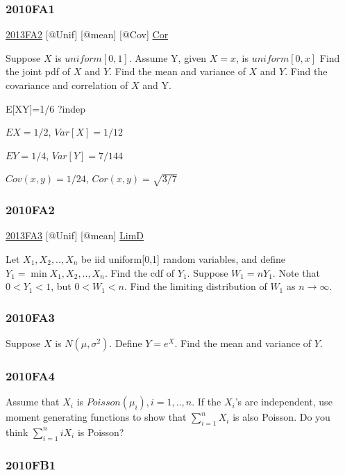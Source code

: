 \documentclass[10pt,twocolumn,portrait]{article}
\begin{document}
\hypertarget{fa1-1}{%
\subsubsection{2010FA1}\label{fa1-1}}

\protect\hyperlink{fa2-2}{2013FA2} {[}@Unif{]} {[}@mean{]} {[}@Cov{]}
\protect\hyperlink{Cor}{Cor}

Suppose \(X\) is \(uniform[0,1]\). Assume Y, given \(X=x\), is
\(uniform[0,x]\) Find the joint pdf of \(X\) and \(Y\). Find the mean
and variance of \(X\) and \(Y\). Find the covariance and correlation of
\(X\) and Y.

E{[}XY{]}=1/6 ?indep

\(EX=1/2\), \(Var[X]=1/12\)

\(EY=1/4\), \(Var[Y]=7/144\)

\(Cov(x,y)=1/24\), \(Cor(x,y)=\sqrt{3/7}\)

\hypertarget{fa2-1}{%
\subsubsection{2010FA2}\label{fa2-1}}

\protect\hyperlink{fa3-2}{2013FA3} {[}@Unif{]} {[}@mean{]}
\protect\hyperlink{LimD}{LimD}

Let \(X_1,X_2,..,X_{n}\) be iid uniform{[}0,1{]} random variables, and
define \(Y_1=\min{X_1,X_2,..,X_{n}}\). Find the cdf of \(Y_1\). Suppose
\(W_1=nY_1\). Note that \(0<Y_1<1\), but \(0<W_1<n\). Find the limiting
distribution of \(W_1\) as \(n\to\infty\).

\hypertarget{fa3-1}{%
\subsubsection{2010FA3}\label{fa3-1}}

Suppose \(X\) is \(N(\mu,\sigma^2)\). Define \(Y=e^X\). Find the mean
and variance of \(Y\).

\hypertarget{fa4-1}{%
\subsubsection{2010FA4}\label{fa4-1}}

Assume that \(X_i\) is \(Poisson(\mu_i),i=1,..,n\). If the \(X_i\)'s are
independent, use moment generating functions to show that
\(\sum_{i=1}^n X_i\) is also Poisson. Do you think \(\sum_{i=1}^n iX_i\)
is Poisson?

\hypertarget{fb1-1}{%
\subsubsection{2010FB1}\label{fb1-1}}
\end{document}
